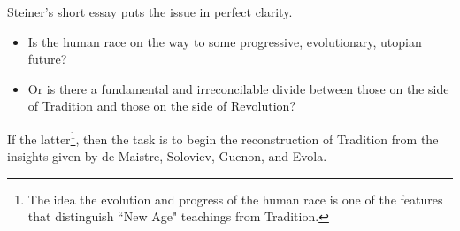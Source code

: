 Steiner's short essay puts the issue in perfect clarity.

\begin{itemize}
\item Is the human race on the way to some progressive, evolutionary, utopian future? 
\item Or is there a fundamental and irreconcilable divide between those on the side of Tradition and those on the side of Revolution? 
\end{itemize}
If the latter\footnote{The idea the evolution and progress of the human race is one of the features that distinguish ``New Age" teachings from Tradition.}, then the task is to begin the reconstruction of Tradition from the insights given by de Maistre, Soloviev, Guenon, and Evola.



